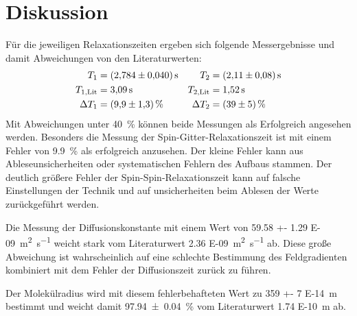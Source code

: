 \section{Diskussion}
\label{sec:Diskussion}
Für die jeweiligen Relaxationszeiten ergeben sich folgende Messergebnisse und damit Abweichungen von den Literaturwerten:
\begin{align*}
    T_1 & = \SI{2.784 +- 0.04}{\second} & T_2 & = \SI{2.11 +- 0.08}{\second}\\
    T_{1,\text{Lit}} & = \SI{3.09}{\second} & T_{2,\text{Lit}} & = \SI{1.52}{\second}\\
    \Delta T_1 & = \SI{9.9+-1.3}{\percent} & \Delta T_2 & = \SI{39 +- 5}{\percent}\\
\end{align*}
Mit Abweichungen unter \SI{40}{\percent} können beide Messungen als Erfolgreich angesehen werden.
Besonders die Messung der Spin-Gitter-Relaxationszeit ist mit einem Fehler von \SI{9.9}{\percent} als erfolgreich anzusehen.
Der kleine Fehler kann aus Ableseunsicherheiten oder systematischen Fehlern des Aufbaus stammen.
Der deutlich größere Fehler der Spin-Spin-Relaxationszeit kann auf falsche Einstellungen der Technik und auf unsicherheiten beim Ablesen der Werte zurückgeführt werden.

Die Messung der Diffusionskonstante mit einem Wert von \SI{59.58 +- 1.29 E-09}{\metre \squared  \per \second} weicht stark vom Literaturwert \SI{2.36 E-09}{\metre\squared\per\second} ab.
Diese große Abweichung ist wahrscheinlich auf eine schlechte Bestimmung des Feldgradienten kombiniert mit dem Fehler der Diffusionszeit zurück zu führen.

Der Molekülradius wird mit diesem fehlerbehafteten Wert zu \SI{359 +- 7 E-14}{\metre} bestimmt und weicht damit \SI{97.94 +-0.04}{\percent} vom Literaturwert \SI{1.74 E-10}{\metre} ab.